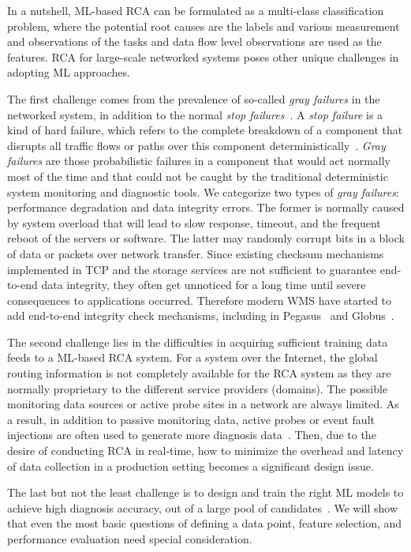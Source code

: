 In a nutshell, ML-based RCA can be formulated as a multi-class classification problem, where the potential root causes are the labels and various 
measurement and observations of the tasks and data flow level observations are used as the features.
RCA for large-scale networked systems poses other unique challenges in adopting ML approaches.
 
The first challenge comes from the prevalence of so-called {\it gray failures} in the networked system, in addition to the normal {\it stop failures}~\cite{GrayFailure:2017,DeepView:NSDI18}. A {\it stop failure} is a kind of hard failure, which refers to the complete breakdown of a component that disrupts all traffic flows or paths over this component deterministically~\cite{Link-JIoT-2019}. {\it Gray failures} are those probabilistic failures in a component that would act normally most of the time and that could not be caught by the traditional deterministic system monitoring and diagnostic tools. We categorize two types of  {\it gray failures}: performance degradation and data integrity errors. The former is normally caused by system overload that will lead to slow response, timeout, and the frequent reboot of the servers or software. The latter may randomly corrupt bits in a block of data or packets over network transfer. Since existing checksum mechanisms implemented in TCP and the storage services are not sufficient to guarantee end-to-end data integrity, they often get unnoticed for a long time until severe consequences to applications occurred. Therefore modern WMS have started to add end-to-end integrity check mechanisms, including in Pegasus~\cite{swip:pearc:2019} and Globus~\cite{IntegrityVerification:DataTransfer}.

The second challenge lies in the difficulties in acquiring sufficient training data feeds to a ML-based RCA system. For a system over the Internet, the global routing information is not completely available for the RCA system as they are normally proprietary to the different service providers (domains). The possible monitoring data sources or active probe sites in a network are always limited. As a result, in addition to passive monitoring data, active probes or event fault injections are often used to generate more diagnosis data~\cite{active:iot:2019, NetPoirot:Sigcomm2016}. Then, due to the desire of conducting RCA in real-time, how to minimize the overhead and latency of data collection in a production setting becomes a significant design issue.

The last but not the least challenge is to design and train the right ML models to achieve high diagnosis accuracy, out of a large pool of candidates~\cite{Boutaba:2018aa}. We will show that even the most basic questions of defining a data point, feature selection, and performance evaluation need special consideration.

